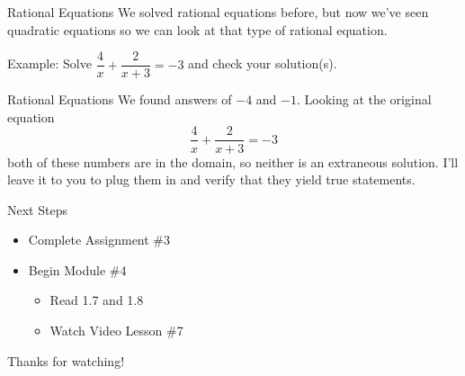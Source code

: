 \documentclass{beamer}
\begin{document}
\begin{frame}[t]{Rational Equations}
We solved rational equations before, but now we've seen quadratic equations so we can look at that type of rational equation.

\pause

Example: Solve $\dfrac{4}{x} + \dfrac{2}{x+3} = -3$ and check your solution(s).
\end{frame}

\begin{frame}[t]{Rational Equations}
We found answers of $-4$ and $-1$. Looking at the original equation $$\dfrac{4}{x} + \dfrac{2}{x+3} = -3$$ both of these numbers are in the domain, so neither is an extraneous solution. I'll leave it to you to plug them in and verify that they yield true statements.
\end{frame}

\begin{frame}[t]{Next Steps}
\begin{itemize}
\item Complete Assignment \#3
\item Begin Module \#4
\begin{itemize}
\item Read 1.7 and 1.8
\item Watch Video Lesson \#7
\end{itemize}
\end{itemize}

\vfill

Thanks for watching!
\end{frame}
\end{document}
